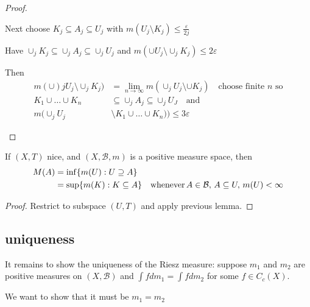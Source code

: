 \begin{proof}
\begin{enumerate}
	Next choose $K_j \subseteq A_j \subseteq U_j$ with  $m(U_j \setminus K_j) \leq \frac{\varepsilon}{2j}$ 

	Have $\cup_j K_j \subseteq \cup_j A_j \subseteq \cup_j U_j$ and  $m(\cup U_j \setminus \cup_j K_j ) \leq 2 \varepsilon$ 

	Then 
	\begin{align*}
		m( \cup)j U_j \setminus \cup_j K_j) &= \lim_{n \to \infty} m ( \cup_j U_j \setminus \cup K_j) \quad \text{choose finite $n$ so} \\
		K_1 \cup \ldots \cup K_n &\subseteq \cup_j A_j \subseteq \cup_j U_J \quad \text{and} \\
		m(\cup_j U_j &\setminus K_1 \cup \ldots \cup K_n )) \leq 3\varepsilon
	\end{align*} 
\end{enumerate}

\end{proof}

\begin{lemma}
	If $(X, T)$ nice, and $(X,\mathcal{B}, m)$ is a positive measure space, then
	\begin{align*}
		M(A) &= \inf\{m(U) : U \supseteq A\} \\
			 &= \sup \{m(K) : K \subseteq A \} \quad \text{whenever} \, A \in \mathcal{B},
			 \, A \subseteq U, \, m(U) < \infty
	\end{align*}
\end{lemma}

\begin{proof}
	Restrict to subspace $(U,T)$ and apply previous lemma.
\end{proof}

\subsection*{uniqueness}
It remains to show the uniqueness of the Riesz measure: suppose $m_1$ and $m_2$ are positive measures on $(X,\mathcal{B})$ and $\int f dm_1 = \int f dm_2$ for some  $f \in C_c(X)$.


We want to show that it must be  $m_1 = m_2$

